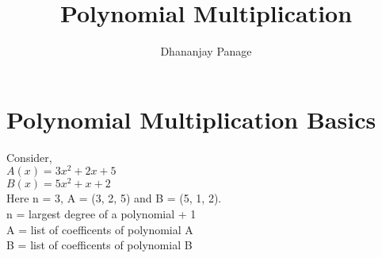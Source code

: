 \documentclass{article}
\title {Polynomial Multiplication}
\author{Dhananjay Panage}
\date{}
\begin{document}
\maketitle

\section *{Polynomial Multiplication Basics}
Consider, \\
$A(x) = 3x^2 + 2x + 5$ \\
$B(x) = 5x^2 + x + 2$ \\
\noindent
Here n = 3, A = (3, 2, 5) and B = (5, 1, 2). \\
n = largest degree of a polynomial + 1 \\ 
A = list of coefficents of polynomial A \\ 
B = list of coefficents of polynomial B \\
\end{document}
